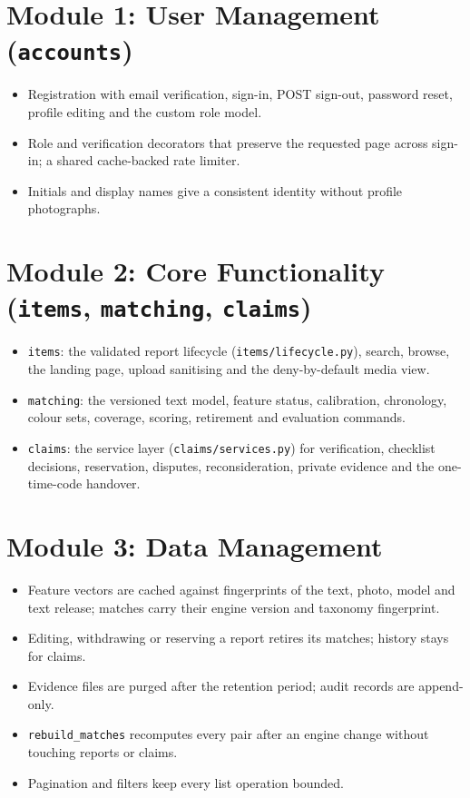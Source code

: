 \documentclass[12pt,a4paper,oneside]{report}
\newcommand{\code}[1]{\texttt{#1}}
\begin{document}
\section{Module 1: User Management (\code{accounts})}
\begin{itemize}
  \item Registration with email verification, sign-in, POST sign-out, password reset, profile editing and the custom role model.
  \item Role and verification decorators that preserve the requested page across sign-in; a shared cache-backed rate limiter.
  \item Initials and display names give a consistent identity without profile photographs.
\end{itemize}

\section{Module 2: Core Functionality (\code{items}, \code{matching}, \code{claims})}
\begin{itemize}
  \item \code{items}: the validated report lifecycle (\code{items/lifecycle.py}), search, browse, the landing page, upload sanitising and the deny-by-default media view.
  \item \code{matching}: the versioned text model, feature status, calibration, chronology, colour sets, coverage, scoring, retirement and evaluation commands.
  \item \code{claims}: the service layer (\code{claims/services.py}) for verification, checklist decisions, reservation, disputes, reconsideration, private evidence and the one-time-code handover.
\end{itemize}

\section{Module 3: Data Management}
\begin{itemize}
  \item Feature vectors are cached against fingerprints of the text, photo, model and text release; matches carry their engine version and taxonomy fingerprint.
  \item Editing, withdrawing or reserving a report retires its matches; history stays for claims.
  \item Evidence files are purged after the retention period; audit records are append-only.
  \item \code{rebuild\_matches} recomputes every pair after an engine change without touching reports or claims.
  \item Pagination and filters keep every list operation bounded.
\end{itemize}
\end{document}
